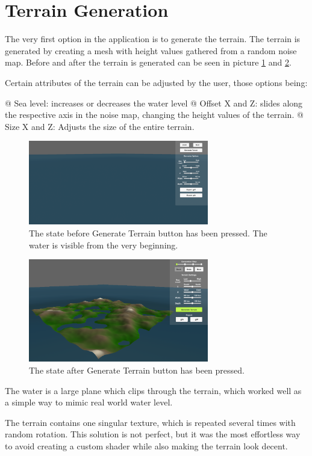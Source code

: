 \section{Terrain Generation}

The very first option in the application is to generate the terrain.
The terrain is generated by creating a mesh with height values gathered from a random noise map.
Before and after the terrain is generated can be seen in picture \ref{fig:no_terr} and \ref{fig:terr}.

Certain attributes of the terrain can be adjusted by the user, those options being:

\begin{easylist}
 @ Sea level: increases or decreases the water level
 @ Offset X and Z: slides along the respective axis in the noise map, changing the height values of the terrain.
 @ Size X and Z: Adjusts the size of the entire terrain.
\end{easylist}

\begin{figure}[H]
  \centering

  \includegraphics[width=0.7\textwidth]{figure/terrain_not_generated.png}
  \caption{The state before Generate Terrain button has been pressed. The water is visible from the very beginning.}

  \label{fig:no_terr}
\end{figure}

\begin{figure}[H]
  \centering

  \includegraphics[width=0.7\textwidth]{figure/terrain_generated.png}
  \caption{The state after Generate Terrain button has been pressed.}

  \label{fig:terr}
\end{figure}

 
The water is a large plane which clips through the terrain, which worked well as a simple way to mimic real world water level.

The terrain contains one singular texture, which is repeated several times with random rotation.
This solution is not perfect, but it was the most effortless way to avoid creating a custom shader while also making the terrain look decent.
